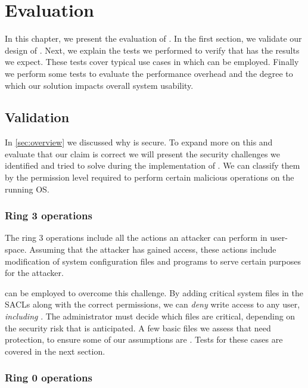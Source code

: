 \acresetall
\chapter{Evaluation}\label{ch:chapter4}

In this chapter, we present the evaluation of . In the first section, we validate our design of . Next, we explain the tests we performed to verify that  has the results we expect. These tests cover typical use cases in which  can be employed. Finally we perform some tests to evaluate the performance overhead and the degree to which our solution impacts overall system usability.

\section{Validation}\label{sec:validation}

\par In \ref{sec:overview} we discussed why  is secure. To expand more on this and evaluate that our claim is correct we will present the security challenges we identified and tried to solve during the implementation of . We can classify them by the permission level required to perform certain malicious operations on the running \ac{OS}. 

\subsection{Ring 3 operations}

\par The ring 3 operations include all the actions an attacker can perform in user-space. Assuming that the attacker has gained  access, these actions include modification of system configuration files and programs to serve certain purposes for the attacker. 
\par {} can be employed to overcome this challenge. By adding critical system files in the \acp{SACL} along with the correct permissions, we can \emph{deny} write access to any user, \emph{including} . The administrator must decide which files are critical, depending on the security risk that is anticipated. A few basic files we assess that need protection, to ensure some of our assumptions are . Tests for these cases are covered in the next section.

\subsection{Ring 0 operations}\label{sub:ring0}

